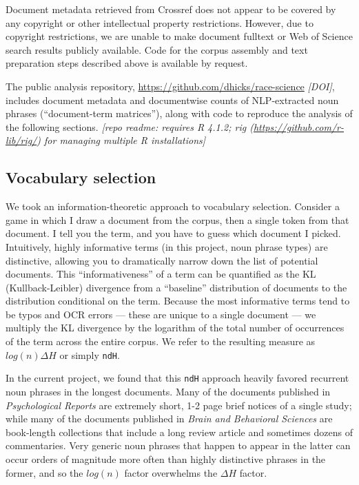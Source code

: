 \documentclass[12pt]{article}
\begin{document}
Document metadata retrieved from Crossref does not appear to be covered by any copyright or other intellectual property restrictions. However, due to copyright restrictions, we are unable to make document fulltext or Web of Science search results publicly available. Code for the corpus assembly and text preparation steps described above is available by request.

The public analysis repository, \url{https://github.com/dhicks/race-science} \emph{{[}DOI{]}}, includes document metadata and documentwise counts of NLP-extracted noun phrases (``document-term matrices''), along with code to reproduce the analysis of the following sections. \emph{{[}repo readme: requires R 4.1.2; rig (\url{https://github.com/r-lib/rig/}) for managing multiple R installations{]}}

\hypertarget{vocabulary-selection}{%
\subsection{Vocabulary selection}\label{vocabulary-selection}}

We took an information-theoretic approach to vocabulary selection\cite{HicksProductivityInterdisciplinaryImpacts2021}. Consider a game in which I draw a document from the corpus, then a single token from that document. I tell you the term, and you have to guess which document I picked. Intuitively, highly informative terms (in this project, noun phrase types) are distinctive, allowing you to dramatically narrow down the list of potential documents. This ``informativeness'' of a term can be quantified as the KL (Kullback-Leibler) divergence from a ``baseline'' distribution of documents to the distribution conditional on the term. Because the most informative terms tend to be typos and OCR errors --- these are unique to a single document --- we multiply the KL divergence by the logarithm of the total number of occurrences of the term across the entire corpus. We refer to the resulting measure as \(log(n) \Delta H\) or simply \texttt{ndH}.

In the current project, we found that this \texttt{ndH} approach heavily favored recurrent noun phrases in the longest documents. Many of the documents published in \emph{Psychological Reports} are extremely short, 1-2 page brief notices of a single study; while many of the documents published in \emph{Brain and Behavioral Sciences} are book-length collections that include a long review article and sometimes dozens of commentaries. Very generic noun phrases that happen to appear in the latter can occur orders of magnitude more often than highly distinctive phrases in the former, and so the \(log(n)\) factor overwhelms the \(\Delta H\) factor.
\end{document}
